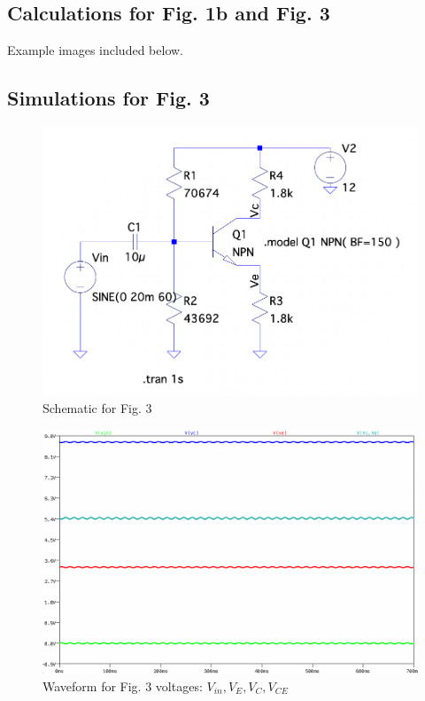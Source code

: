 \documentclass{article}
\begin{document}
		\subsection*{Calculations for Fig. 1b and Fig. 3}
			Example images included below.
			
		\subsection*{Simulations for Fig. 3}
			\begin{figure}[H]
		    \includegraphics[width=12cm]{Fig 3 Schematic}
		    \centering
		    \caption{Schematic for Fig. 3}
		    \end{figure}
		    
			\begin{figure}[H]
		    \includegraphics[width=12cm]{Fig 3 Wave}
		    \centering
		    \caption{Waveform for Fig. 3 voltages: $V_{in}, V_{E}, V_{C}, V_{CE}$}
		    \end{figure}
\end{document}

